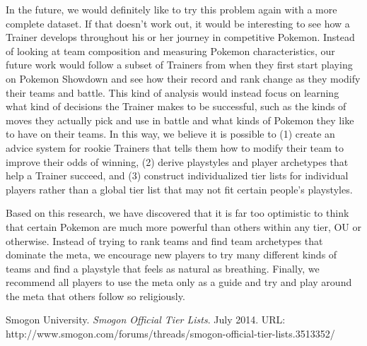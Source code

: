 \documentclass{acm_proc_article-sp}
\begin{document}
In the future, we would definitely like to try this problem again with a more complete dataset. If that doesn't work out, it would be interesting to see how a Trainer develops throughout his or her journey in competitive Pokemon. Instead of looking at team composition and measuring Pokemon characteristics, our future work would follow a subset of Trainers from when they first start playing on Pokemon Showdown and see how their record and rank change as they modify their teams and battle. This kind of analysis would instead focus on learning what kind of decisions the Trainer makes to be successful, such as the kinds of moves they actually pick and use in battle and what kinds of Pokemon they like to have on their teams. In this way, we believe it is possible to (1) create an advice system for rookie Trainers that tells them how to modify their team to improve their odds of winning, (2) derive playstyles and player archetypes that help a Trainer succeed, and (3) construct individualized tier lists for individual players rather than a global tier list that may not fit certain people's playstyles.

Based on this research, we have discovered that it is far too optimistic to think that certain Pokemon are much more powerful than others within any tier, OU or otherwise. Instead of trying to rank teams and find team archetypes that dominate the meta, we encourage new players to try many different kinds of teams and find a playstyle that feels as natural as breathing. Finally, we recommend all players to use the meta only as a guide and try and play around the meta that others follow so religiously.

\begin{thebibliography}{1}

  Smogon University.
  \emph{Smogon Official Tier Lists}.
  July 2014.
  URL: http://www.smogon.com/forums/threads/smogon-official-tier-lists.3513352/

\end{thebibliography}
\end{document}
